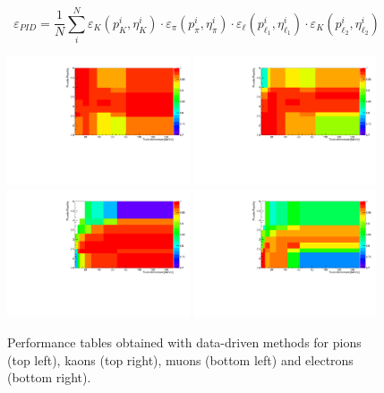 \begin{equation}
\varepsilon_{PID} = \frac{1}{N} \sum_i^N \varepsilon_K(p_K^i,\eta_K^i) \cdot \varepsilon_\pi(p_\pi^i,\eta_\pi^i) \cdot \varepsilon_\ell(p_{\ell_1}^i,\eta_{\ell_1}^i) \cdot \varepsilon_K(p_{\ell_2}^i,\eta_{\ell_2}^i)
\end{equation}

\begin{figure}[h!]
\centering
\includegraphics[width=0.48\textwidth]{RKst/figs/pid_Pi.pdf}
\includegraphics[width=0.48\textwidth]{RKst/figs/pid_K.pdf}
\includegraphics[width=0.48\textwidth]{RKst/figs/pid_Mu.pdf}
\includegraphics[width=0.48\textwidth]{RKst/figs/pid_e.pdf}
\caption{Performance tables obtained with data-driven methods
for pions (top left), kaons (top right), muons (bottom left) and electrons (bottom right).}
\label{fig:pid_perf_hist}
\end{figure}


